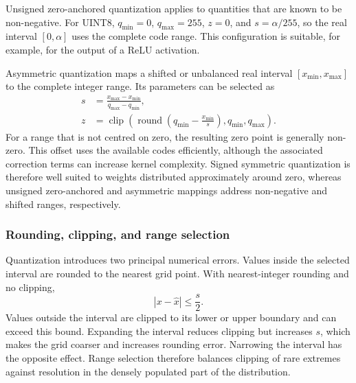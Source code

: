 \documentclass[
    a4paper,
    12pt,
    titlepage,
    bibliography=totoc,
    twoside=on,
    parskip=false,
    numbers=noenddot,
    cleardoublepage=empty,
    DIV=12,
    BCOR=12.0mm,
    headheight=36pt,
    headings=openright
]{scrreprt}
\begin{document}
Unsigned zero-anchored quantization applies to quantities that are known to be non-negative. For UINT8, $q_{\min}=0$, $q_{\max}=255$, $z=0$, and $s=\alpha/255$, so the real interval $[0,\alpha]$ uses the complete code range. This configuration is suitable, for example, for the output of a ReLU activation.

Asymmetric quantization maps a shifted or unbalanced real interval $[x_{\min},x_{\max}]$ to the complete integer range. Its parameters can be selected as
\begin{align}
    s&=\frac{x_{\max}-x_{\min}}{q_{\max}-q_{\min}}, \label{eq:fundamental_asymmetric_scale}\\
    z&=\operatorname{clip}\!\left(
    \operatorname{round}\!\left(q_{\min}-\frac{x_{\min}}{s}\right),
    q_{\min},q_{\max}
    \right).
    \label{eq:fundamental_asymmetric_zero}
\end{align}
For a range that is not centred on zero, the resulting zero point is generally non-zero. This offset uses the available codes efficiently, although the associated correction terms can increase kernel complexity. Signed symmetric quantization is therefore well suited to weights distributed approximately around zero, whereas unsigned zero-anchored and asymmetric mappings address non-negative and shifted ranges, respectively.

\subsubsection{Rounding, clipping, and range selection}

Quantization introduces two principal numerical errors. Values inside the selected interval are rounded to the nearest grid point. With nearest-integer rounding and no clipping,
\begin{equation}
    \left|x-\widehat x\right|
    \leq
    \frac{s}{2}.
    \label{eq:fundamental_rounding_bound}
\end{equation}
Values outside the interval are clipped to its lower or upper boundary and can exceed this bound. Expanding the interval reduces clipping but increases $s$, which makes the grid coarser and increases rounding error. Narrowing the interval has the opposite effect. Range selection therefore balances clipping of rare extremes against resolution in the densely populated part of the distribution.\autocite{nagelWhitePaperNeural2021,bannerPostTraining4bit2019}
\end{document}
